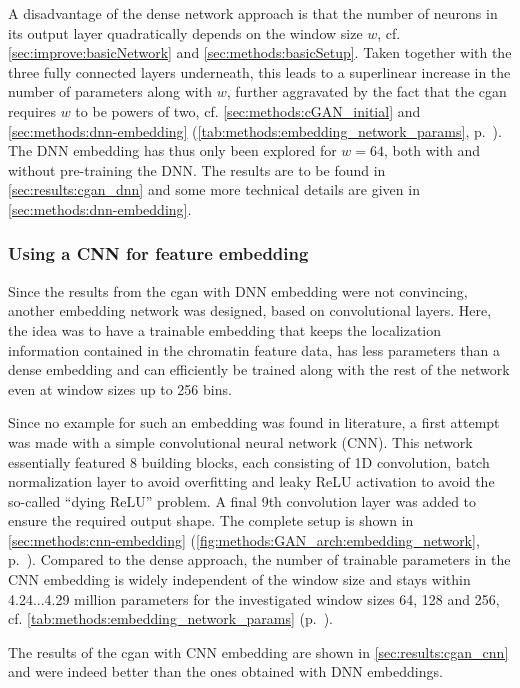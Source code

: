 A disadvantage of the dense network approach is that the number of neurons in its output layer quadratically depends on the window size $w$,
cf. \cref{sec:improve:basicNetwork} and \ref{sec:methods:basicSetup}.
Taken together with the three fully connected layers underneath, this leads to a superlinear increase in the number of parameters along with $w$,
further aggravated by the fact that the \acrshort{cgan} requires $w$ to be powers of two, cf. \cref{sec:methods:cGAN_initial} and  
\ref{sec:methods:dnn-embedding} (\cref{tab:methods:embedding_network_params}, p.~\pageref{tab:methods:embedding_network_params}).
The DNN embedding has thus only been explored for $w=64$, both with and without pre-training the DNN. 
The results are to be found in \cref{sec:results:cgan_dnn} and some more technical details are given in \cref{sec:methods:dnn-embedding}.

\subsubsection{Using a CNN for feature embedding} \label{sec:improve:CNN_embedding}
Since the results from the \acrshort{cgan} with DNN embedding were not convincing, another embedding network was designed, based on convolutional layers.
Here, the idea was to have a trainable embedding that keeps the localization information contained in the chromatin feature data,
has less parameters than a dense embedding and can efficiently be trained along with the rest of the network even at window sizes up to 256 bins.

Since no example for such an embedding was found in literature, a first attempt was made with a simple convolutional neural network (CNN).
This network essentially featured 8 building blocks, each consisting of 1D convolution, batch normalization layer to avoid overfitting and leaky ReLU activation \cite{Maas2013}
to avoid the so-called ``dying ReLU'' problem. 
A final 9th convolution layer was added to ensure the required output shape. 
The complete setup is shown in \cref{sec:methods:cnn-embedding} (\cref{fig:methods:GAN_arch:embedding_network}, p.~\pageref{fig:methods:GAN_arch:embedding_network}).
Compared to the dense approach, the number of trainable parameters in the CNN embedding is widely independent of the window size and 
stays within 4.24...4.29 million parameters for the investigated window sizes 64, 128 and 256, cf. \cref{tab:methods:embedding_network_params} (p.~\pageref{tab:methods:embedding_network_params}).

The results of the \acrshort{cgan} with CNN embedding are shown in \cref{sec:results:cgan_cnn} and were indeed better than the ones obtained with DNN embeddings.

